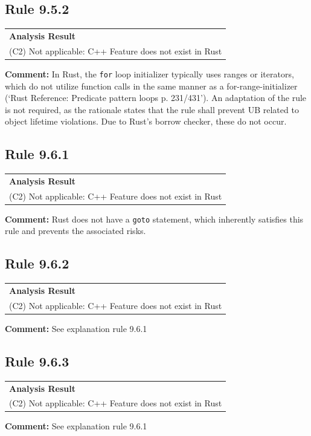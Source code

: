 \subsection*{Rule 9.5.2}
\begin{longtable}{p{13cm}}
\textbf{Analysis Result} \\
(C2) Not applicable: C++ Feature does not exist in Rust \\
\end{longtable}
\textbf{Comment:} In Rust, the \texttt{for} loop initializer typically uses ranges or iterators, which do not utilize function calls in the same manner as a for-range-initializer (`Rust Reference: Predicate pattern loops p. 231/431'). An adaptation of the rule is not required, as the rationale states that the rule shall prevent UB related to object lifetime violations. Due to Rust's borrow checker, these do not occur. \\
\subsection*{Rule 9.6.1}
\begin{longtable}{p{13cm}}
\textbf{Analysis Result} \\
(C2) Not applicable: C++ Feature does not exist in Rust \\
\end{longtable}
\textbf{Comment:} Rust does not have a \texttt{goto} statement, which inherently satisfies this rule and prevents the associated risks. \\
\subsection*{Rule 9.6.2}
\begin{longtable}{p{13cm}}
\textbf{Analysis Result} \\
(C2) Not applicable: C++ Feature does not exist in Rust \\
\end{longtable}
\textbf{Comment:} See explanation rule 9.6.1 \\
\subsection*{Rule 9.6.3}
\begin{longtable}{p{13cm}}
\textbf{Analysis Result} \\
(C2) Not applicable: C++ Feature does not exist in Rust \\
\end{longtable}
\textbf{Comment:} See explanation rule 9.6.1 \\
